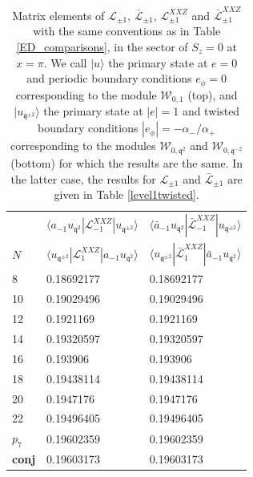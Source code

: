 \documentclass[a4paper,10pt]{article}
\newcommand{\q}{\mathfrak{q}}
\newcommand{\aSt}{\mathcal{W}}
\newcommand{\AStTL}[2]{\aSt_{#1,#2}}
\newcommand{\KSgen}{\mathcal{L}}
\begin{document}
\begin{table}[h]
\begin{tabular}{lll}
     \vspace*{5pt}     & $\langle a_{-1}u_{\q^2} | \KSgen_{-1}^{XXZ} | u_{\q^{\pm 2}} \rangle$  & $\langle \bar{a}_{-1}u_{\q^2} |\bar{\KSgen}_{-1}^{XXZ}| u_{\q^{\pm 2}} \rangle$    \\
  $N$    & $\langle u_{\q^{\pm 2}}| \KSgen_{1}^{XXZ} | a_{-1}u_{\q^2} \rangle$  & $\langle u_{\q^{\pm 2}} |\bar{\KSgen}_{1}^{XXZ}| \bar{a}_{-1}u_{\q^2} \rangle$    \\
\hline
8 & 0.18692177 & 0.18692177 \\
10 & 0.19029496 & 0.19029496 \\
12 & 0.1921169 & 0.1921169 \\
14 & 0.19320597 & 0.19320597 \\
16 & 0.193906 & 0.193906 \\
18 & 0.19438114 & 0.19438114 \\
20 & 0.1947176 & 0.1947176 \\
22 & 0.19496405 & 0.19496405 \\
$p_7$ & 0.19602359 & 0.19602359 \\
 \textbf{conj} & 0.19603173 & 0.19603173 \\
\hline
\end{tabular}




\caption{Matrix elements  of $\KSgen_{\pm 1}$, $\bar{\KSgen}_{\pm 1}$, $\KSgen_{\pm 1}^{XXZ}$ and $\bar{\KSgen}_{\pm 1}^{XXZ}$ with the same conventions as in Table \ref{ED_comparisons}, in the sector of $S_z=0$ at $x=\pi$. We call $|u\rangle$ the primary state at $e=0$ and periodic boundary conditions $e_\phi=0$ corresponding to the module $\AStTL{0}{1}$ (top), and $|u_{\q^{\pm 2}}\rangle$ the primary state at $|e|=1$ and twisted boundary conditions $|e_\phi|=-\alpha_{-}/\alpha_{+}$ corresponding to the modules $\AStTL{0}{\q^{2}}$ and $\AStTL{0}{\q^{-2}}$(bottom) for which the results are the same. In the latter case, the results for $\KSgen_{\pm 1}$ and $\bar{\KSgen}_{\pm 1}$ are given in Table \ref{level1twisted}. 
%
}\label{hi_gs}
\end{table}
\end{document}
